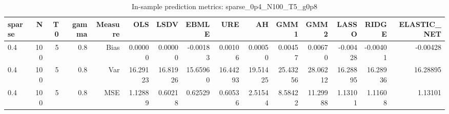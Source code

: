\begin{table}[!htbp]\centering
\caption{In-sample prediction metrics: sparse_0p4_N100_T5_g0p8}
\label{tab:table2_sparse_0p4_N100_T5_g0p8}
\begin{tabular}{lrrrrrrrrrrrrrr}
\hline
sparse & N & T0 & gamma & Measure & OLS & LSDV & EBMLE & URE & AH & GMM1 & GMM2 & LASSO & RIDGE & ELASTIC_NET \\
\hline
0.4 & 100 & 5 & 0.8 & Bias & 0.00000 & 0.00000 & -0.00183 & 0.00106 & 0.00050 & 0.00457 & 0.00670 & -0.00428 & -0.00401 & -0.00428 \\
0.4 & 100 & 5 & 0.8 & Var & 16.29123 & 16.81926 & 15.65960 & 16.44293 & 19.51425 & 25.43256 & 28.06212 & 16.28895 & 16.28936 & 16.28895 \\
0.4 & 100 & 5 & 0.8 & MSE & 1.12889 & 0.60218 & 0.62529 & 0.60536 & 2.51544 & 8.58422 & 11.29988 & 1.13101 & 1.11608 & 1.13101 \\
\hline
\end{tabular}
\end{table}

